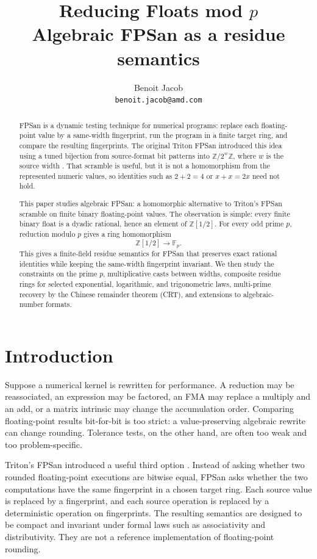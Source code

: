 \documentclass[11pt]{article}
\title{Reducing Floats mod \(p\)\\
       \large Algebraic FPSan as a residue semantics}
\author{Benoit Jacob\\\texttt{benoit.jacob@amd.com}}
\date{}
\newcommand{\Z}{\mathbb{Z}}
\newcommand{\F}{\mathbb{F}}
\theoremstyle{plain}
\begin{document}
\maketitle

\begin{abstract}
FPSan is a dynamic testing technique for numerical programs: replace each
floating-point value by a same-width fingerprint, run the program in a finite
target ring, and compare the resulting fingerprints.  The original
Triton FPSan introduced this idea using a tuned bijection from source-format bit
patterns into \(\Z/2^w\Z\), where \(w\) is the source width
\cite{triton-fpsan-source,goucher-fpsan-blog}.  That scramble is useful, but it
is not a homomorphism from the represented numeric values, so identities such as
\(2+2=4\) or \(x+x=2x\) need not hold.

This paper studies algebraic FPSan: a homomorphic alternative to Triton's FPSan
scramble on finite binary floating-point values.  The observation is simple:
every finite binary float is a dyadic rational, hence an element of
\(\Z[1/2]\).  For every odd prime \(p\), reduction modulo \(p\) gives a ring
homomorphism
\[
  \Z[1/2] \longrightarrow \F_p.
\]
This gives a finite-field residue semantics for FPSan that preserves exact
rational identities while keeping the same-width fingerprint invariant.  We then
study the constraints on the prime \(p\), multiplicative casts between widths,
composite residue rings for selected exponential, logarithmic, and trigonometric
laws, multi-prime recovery by the Chinese remainder theorem (CRT), and
extensions to algebraic-number formats.
\end{abstract}

\section{Introduction}

Suppose a numerical kernel is rewritten for performance.  A reduction may be
reassociated, an expression may be factored, an FMA may replace a multiply and an
add, or a matrix intrinsic may change the accumulation order.  Comparing
floating-point results bit-for-bit is too strict: a value-preserving algebraic
rewrite can change rounding.  Tolerance tests, on the other hand, are often too
weak and too problem-specific.

Triton's FPSan introduced a useful third option
\cite{triton-fpsan-source}.  Instead of asking whether two rounded
floating-point executions are bitwise equal, FPSan asks whether the two
computations have the same fingerprint in a chosen target ring.  Each
source value is replaced by a fingerprint, and each source operation is replaced
by a deterministic operation on fingerprints.  The resulting semantics are
designed to be compact and invariant under formal laws such as associativity and
distributivity.  They are not a reference implementation of floating-point
rounding.
\end{document}
